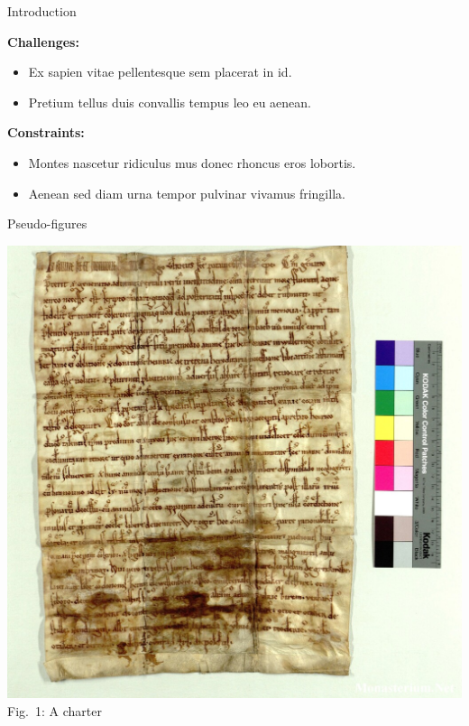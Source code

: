 \documentclass[a0paper,portrait]{baposter}
\newcommand{\compresslist}{
	\setlength{\itemsep}{0pt}%
	\setlength{\parskip}{1pt}%
	\setlength{\parsep}{0pt}%
}
\begin{document}
\begin{poster}
\begin{posterbox}[name=introduction,column=0,row=0, span=3]{Introduction}
    \begin{minipage}{.48\linewidth}
		\textbf{Challenges:}
		\begin{itemize}
            \compresslist %
			\item Ex sapien vitae pellentesque sem placerat in id.
			\item Pretium tellus duis convallis tempus leo eu aenean.
		\end{itemize}
	\end{minipage}%
	\hfill\vline\hfill%
	\begin{minipage}{.48\linewidth}
		\textbf{Constraints:}
		\begin{itemize}
            \compresslist
			\item Montes nascetur ridiculus mus donec rhoncus eros lobortis.
            \item Aenean sed diam urna tempor pulvinar vivamus fringilla. 
			\end{itemize}
	\end{minipage}
\end{posterbox}

\begin{posterbox}[name=pseudo-figure,column=0,below=introduction,span=1]{Pseudo-figures}

	\small
	    
        \begin{minipage}{\textwidth}
        \centering
        \includegraphics[width=.6\textwidth]{9bde06a84833576b4027ae6331553753.img.jpg}\\
         \vspace{.1em}
         Fig.~1: A charter
        \end{minipage}
        \vspace{1em}
        

\end{posterbox}
\end{poster}
\end{document}
